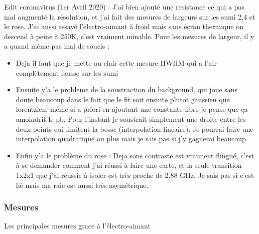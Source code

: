 \documentclass[a4paper]{report}
\begin{document}
  Edit coronavirus (1er Avril 2020) : J'ai bien ajouté une resistance ce qui a pas mal augmenté la résolution, et j'ai fait des mesures de largeurs sur les sumi 2,4 et le rose. J'ai aussi essayé l'electro-aimant à froid mais sans écran thermique on descend à peine à 250K, c'est vraiment minable. Pour les mesures de largeur, il y a quand même pas mal de soucis :
  \begin{itemize}
  \item Deja il faut que je mette au clair cette mesure HWHM qui a l'air complètement fausse sur les sumi
  \item Ensuite y'a le probleme de la soustraction du background, qui joue sans doute beaucoup dans le fait que le fit soit ensuite plutot gaussien que lorentzien, même si a priori en ajoutant une constante libre je pense que ça amoindrit le pb. Pour l'instant je soustrait simplement une droite entre les deux points qui limitent la bosse (interpolation linéaire). Je pourrai faire une interpolation quadratique ou plus mais je sais pas si j'y gagnerai beaucoup.
  \item Enfin y'a le problème du rose : Deja sons contraste est vraiment flingué, c'est à se demander comment j'ai réussi à faire une carte, et la seule transition 1x2x1 que j'ai réussie à isoler est très proche de 2.88 GHz. Je sais pas si c'est lié mais ma raie est aussi très asymétrique.
  \end{itemize}
  \subsubsection{Mesures}
  Les principales mesures grace à l'électro-aimant
  
\end{document}
